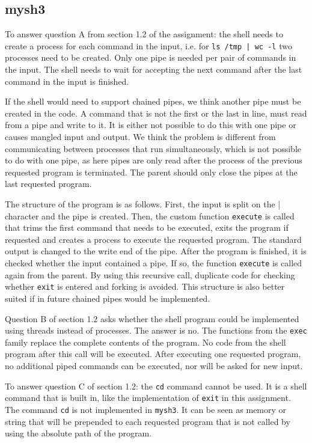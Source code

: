 \documentclass[11pt]{article}
\begin{document}
\subsection{mysh3}

To answer question A from section 1.2 of the assignment: the shell needs to create a process for each command in the input, i.e. for \texttt{ls /tmp | wc -l} two processes need to be created. Only one pipe is needed per pair of commands in the input. The shell needs to wait for accepting the next command after the last command in the input is finished.

If the shell would need to support chained pipes, we think another pipe must be created in the code. A command that is not the first or the last in line, must read from a pipe and write to it. It is either not possible to do this with one pipe or causes mangled input and output. We think the problem is different from communicating between processes that run simultaneously, which is not possible to do with one pipe, as here pipes are only read after the process of the previous requested program is terminated. The parent should only close the pipes at the last requested program.

The structure of the program is as follows. First, the input is split on the | character and the pipe is created. Then, the custom function \texttt{execute} is called that trims the first command that needs to be executed, exits the program if requested and creates a process to execute the requested program. The standard output is changed to the write end of the pipe. After the program is finished, it is checked whether the input contained a pipe. If so, the function \texttt{execute} is called again from the parent. By using this recursive call, duplicate code for checking whether \texttt{exit} is entered and forking is avoided. This structure is also better suited if in future chained pipes would be implemented.

Question B of section 1.2 asks whether the shell program could be implemented using threads instead of processes. The answer is no. The functions from the \texttt{exec} family replace the complete contents of the program. No code from the shell program after this call will be executed. After executing one requested program, no additional piped commands can be executed, nor will be asked for new input.

To answer question C of section 1.2: the \texttt{cd} command cannot be used. It is a shell command that is built in, like the implementation of \texttt{exit} in this assignment. The command \texttt{cd} is not implemented in \texttt{mysh3}. It can be seen as memory or string that will be prepended to each requested program that is not called by using the absolute path of the program.
\end{document}
